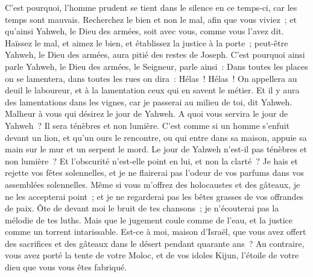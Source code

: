 \begin{multicols}{2}
C'est pourquoi, l'homme prudent se tient dans le silence en ce temps-ci, car les temps sont mauvais.
Recherchez le bien et non le mal, afin que vous viviez~; et qu'ainsi Yahweh, le Dieu des armées, soit avec vous, comme vous l'avez dit.
Haïssez le mal, et aimez le bien, et établissez la justice à la porte~; peut-être Yahweh, le Dieu des armées, aura pitié des restes de Joseph.
C'est pourquoi ainsi parle Yahweh, le Dieu des armées, le Seigneur, parle ainsi~: Dans toutes les places on se lamentera, dans toutes les rues on dira~: Hélas~! Hélas~! On appellera au deuil le laboureur, et à la lamentation ceux qui en savent le métier.
Et il y aura des lamentations dans les vignes, car je passerai au milieu de toi, dit Yahweh.
Malheur à vous qui désirez le jour de Yahweh. A quoi vous servira le jour de Yahweh~? Il sera ténèbres et non lumière.
C'est comme si un homme s'enfuit devant un lion, et qu'un ours le rencontre, ou qui entre dans sa maison, appuie sa main sur le mur et un serpent le mord.
Le jour de Yahweh n'est-il pas ténèbres et non lumière~? Et l'obscurité n'est-elle point en lui, et non la clarté~?
Je hais et rejette vos fêtes solennelles, et je ne flairerai pas l'odeur de vos parfums dans vos assemblées solennelles.
Même si vous m'offrez des holocaustes et des gâteaux, je ne les accepterai point~; et je ne regarderai pas les bêtes grasses de vos offrandes de paix.
Ôte de devant moi le bruit de tes chansons~; je n'écouterai pas la mélodie de tes luths.
Mais que le jugement coule comme de l'eau, et la justice comme un torrent intarissable.
Est-ce à moi, maison d'Israël, que vous avez offert des sacrifices et des gâteaux dans le désert pendant quarante ans~?
Au contraire, vous avez porté la tente de votre Moloc, et de vos idoles Kijun, l'étoile de votre dieu que vous vous êtes fabriqué.

\end{multicols}
